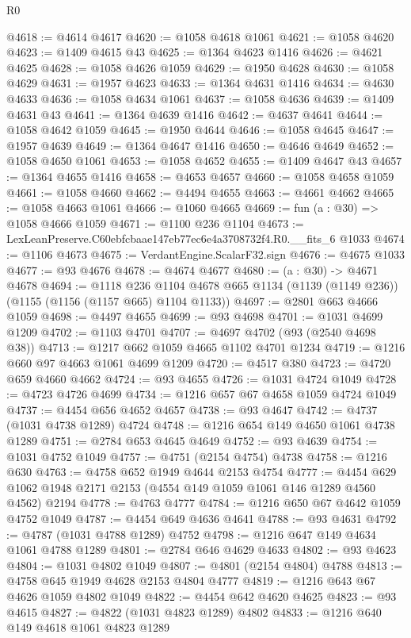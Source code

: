 \begin{lexlean}{R0}
\begin{coremodule}
@4618 := @4614 @4617
@4620 := @1058 @4618 @1061
@4621 := @1058 @4620
@4623 := @1409 @4615 @43
@4625 := @1364 @4623 @1416
@4626 := @4621 @4625
@4628 := @1058 @4626 @1059
@4629 := @1950 @4628
@4630 := @1058 @4629
@4631 := @1957 @4623
@4633 := @1364 @4631 @1416
@4634 := @4630 @4633
@4636 := @1058 @4634 @1061
@4637 := @1058 @4636
@4639 := @1409 @4631 @43
@4641 := @1364 @4639 @1416
@4642 := @4637 @4641
@4644 := @1058 @4642 @1059
@4645 := @1950 @4644
@4646 := @1058 @4645
@4647 := @1957 @4639
@4649 := @1364 @4647 @1416
@4650 := @4646 @4649
@4652 := @1058 @4650 @1061
@4653 := @1058 @4652
@4655 := @1409 @4647 @43
@4657 := @1364 @4655 @1416
@4658 := @4653 @4657
@4660 := @1058 @4658 @1059
@4661 := @1058 @4660
@4662 := @4494 @4655
@4663 := @4661 @4662
@4665 := @1058 @4663 @1061
@4666 := @1060 @4665
@4669 := fun (a : @30) => @1058 @4666 @1059
@4671 := @1100 @236 @1104
@4673 := LexLeanPreserve.C60ebfcbaae147eb77ec6e4a3708732f4.R0.__fits_6 @1033
@4674 := @1106 @4673
@4675 := VerdantEngine.ScalarF32.sign
@4676 := @4675 @1033
@4677 := @93 @4676
@4678 := @4674 @4677
@4680 := (a : @30) -> @4671 @4678
@4694 := @1118
    @236
    @1104
    @4678
    @665
    @1134
    (@1139 (@1149 @236))
    (@1155 (@1156 (@1157 @665) @1104 @1133))
@4697 := @2801 @663 @4666 @1059
@4698 := @4497 @4655
@4699 := @93 @4698
@4701 := @1031 @4699 @1209
@4702 := @1103 @4701
@4707 := @4697 @4702 (@93 (@2540 @4698 @38))
@4713 := @1217 @662 @1059 @4665 @1102 @4701 @1234
@4719 := @1216 @660 @97 @4663 @1061 @4699 @1209
@4720 := @4517 @380
@4723 := @4720 @659 @4660 @4662
@4724 := @93 @4655
@4726 := @1031 @4724 @1049
@4728 := @4723 @4726 @4699
@4734 := @1216 @657 @67 @4658 @1059 @4724 @1049
@4737 := @4454 @656 @4652 @4657
@4738 := @93 @4647
@4742 := @4737 (@1031 @4738 @1289) @4724
@4748 := @1216 @654 @149 @4650 @1061 @4738 @1289
@4751 := @2784 @653 @4645 @4649
@4752 := @93 @4639
@4754 := @1031 @4752 @1049
@4757 := @4751 (@2154 @4754) @4738
@4758 := @1216 @630
@4763 := @4758 @652 @1949 @4644 @2153 @4754
@4777 := @4454 @629 @1062 @1948 @2171 @2153 (@4554 @149 @1059 @1061 @146 @1289 @4560 @4562) @2194
@4778 := @4763 @4777
@4784 := @1216 @650 @67 @4642 @1059 @4752 @1049
@4787 := @4454 @649 @4636 @4641
@4788 := @93 @4631
@4792 := @4787 (@1031 @4788 @1289) @4752
@4798 := @1216 @647 @149 @4634 @1061 @4788 @1289
@4801 := @2784 @646 @4629 @4633
@4802 := @93 @4623
@4804 := @1031 @4802 @1049
@4807 := @4801 (@2154 @4804) @4788
@4813 := @4758 @645 @1949 @4628 @2153 @4804 @4777
@4819 := @1216 @643 @67 @4626 @1059 @4802 @1049
@4822 := @4454 @642 @4620 @4625
@4823 := @93 @4615
@4827 := @4822 (@1031 @4823 @1289) @4802
@4833 := @1216 @640 @149 @4618 @1061 @4823 @1289

\end{coremodule}
\end{lexlean}
